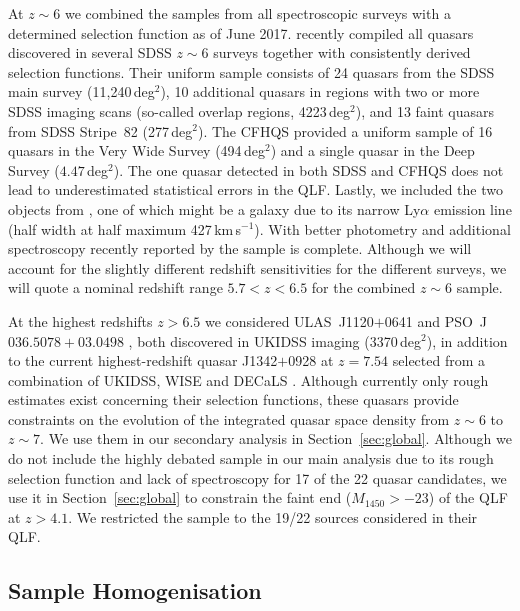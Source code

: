 \documentclass[fleqn,usenatbib]{mnras}
\begin{document}
At $z\sim 6$ we combined the samples from all spectroscopic surveys
with a determined selection function as of June 2017.
\citet{2016ApJ...833..222J} recently compiled all quasars discovered
in several SDSS $z\sim 6$ surveys together with consistently derived
selection functions. Their uniform sample consists of 24 quasars from
the SDSS main survey (11,240\,deg$^2$), 10 additional quasars in
regions with two or more SDSS imaging scans (so-called overlap
regions, 4223\,deg$^2$), and 13 faint quasars from SDSS Stripe~82
(277\,deg$^2$). The CFHQS \citep{2010AJ....139..906W} provided a
uniform sample of 16 quasars in the Very Wide Survey (494\,deg$^2$)
and a single quasar in the Deep Survey ($4.47$\,deg$^2$). The one
quasar detected in both SDSS and CFHQS does not lead to underestimated
statistical errors in the QLF. Lastly, we included the two objects
from \citet{2015ApJ...798...28K}, one of which might be a galaxy due
to its narrow Ly$\alpha$ emission line (half width at half maximum
427\,km\,s$^{-1}$). With better photometry and additional spectroscopy
recently reported by \citet{2017ApJ...847L..15O} the
\citet{2015ApJ...798...28K} sample is complete.  Although we will
account for the slightly different redshift sensitivities for the
different surveys, we will quote a nominal redshift range $5.7<z<6.5$
for the combined $z\sim 6$ sample.

At the highest redshifts $z>6.5$ we considered ULAS~J1120$+$0641
\citep[$z=7.085$,][]{2011Natur.474..616M} and PSO~J$036.5078+03.0498$
\citep[$z=6.527$,][]{2015ApJ...801L..11V}, both discovered in UKIDSS imaging
(3370\,deg$^2$), in addition to the current highest-redshift quasar J1342$+$0928
at $z=7.54$ selected from a combination of UKIDSS, WISE and DECaLS
\citep[$\sim 2500$\,deg$^2$,][]{2018Natur.553..473B}. Although
currently only rough estimates exist concerning their selection
functions, these quasars provide constraints on the evolution of the
integrated quasar space density from $z\sim 6$ to $z\sim 7$.  We use
them in our secondary analysis in Section~\ref{sec:global}.  Although
we do not include the highly debated \citet{2015AA...578A..83G} sample
in our main analysis due to its rough selection function and lack of
spectroscopy for 17 of the 22 quasar candidates, we use it in
Section~\ref{sec:global} to constrain the faint end ($M_{1450}>-23$)
of the QLF at $z>4.1$. We restricted the \citet{2015AA...578A..83G}
sample to the 19/22 sources considered in their QLF.

\subsection{Sample Homogenisation}
\label{sect:datahom}
\end{document}
